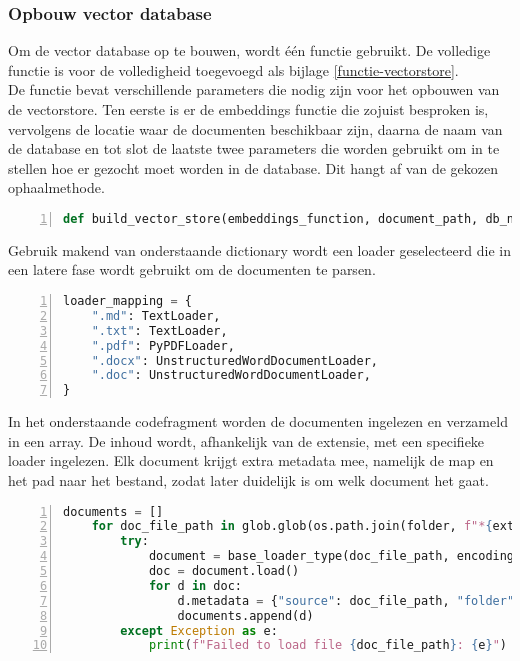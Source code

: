 \subsubsection{Opbouw vector database}
Om de vector database op te bouwen, wordt één functie gebruikt. De volledige functie is voor de volledigheid toegevoegd als bijlage \ref{functie-vectorstore}.
\\[1em]
De functie bevat verschillende parameters die nodig zijn voor het opbouwen van de vectorstore. Ten eerste is er de embeddings functie die zojuist besproken is, vervolgens de locatie waar de documenten beschikbaar zijn, daarna de naam van de database en tot slot de laatste twee parameters die worden gebruikt om in te stellen hoe er gezocht moet worden in de database. Dit hangt af van de gekozen ophaalmethode.

\begin{lstlisting}[basicstyle=\small, frame=single, breaklines=true, postbreak=\mbox{\textcolor{red}{$\hookrightarrow$}\space}, escapeinside ={\%,}, escapechar={!},
    numbers=left, language=Python, caption=Functie met parameters]
def build_vector_store(embeddings_function, document_path, db_name, search_type, search_kwargs):
\end{lstlisting}

Gebruik makend van onderstaande dictionary wordt een loader geselecteerd die in een latere fase wordt gebruikt om de documenten te parsen.

\begin{lstlisting}[basicstyle=\small, frame=single, breaklines=true, postbreak=\mbox{\textcolor{red}{$\hookrightarrow$}\space}, escapeinside ={\%,}, escapechar={!},
    numbers=left, language=Python, caption=Mapping van bestandsextensies naar de bijbehorende document loaders]
loader_mapping = {
    ".md": TextLoader,
    ".txt": TextLoader,
    ".pdf": PyPDFLoader,
    ".docx": UnstructuredWordDocumentLoader,
    ".doc": UnstructuredWordDocumentLoader,
}
\end{lstlisting}

In het onderstaande codefragment worden de documenten ingelezen en verzameld in een array. De inhoud wordt, afhankelijk van de extensie, met een specifieke loader ingelezen. Elk document krijgt extra metadata mee, namelijk de map en het pad naar het bestand, zodat later duidelijk is om welk document het gaat.

\begin{lstlisting}[basicstyle=\small, frame=single, breaklines=true, postbreak=\mbox{\textcolor{red}{$\hookrightarrow$}\space}, escapeinside ={\%,}, escapechar={!},
    numbers=left, language=Python, caption=Inladen en parsen van documenten per bestandstype met toevoeging van metadata]
    documents = []
    for doc_file_path in glob.glob(os.path.join(folder, f"*{ext}")):
        try:
            document = base_loader_type(doc_file_path, encoding="utf-8")
            doc = document.load()
            for d in doc:
                d.metadata = {"source": doc_file_path, "folder": folder}
                documents.append(d)
        except Exception as e:
            print(f"Failed to load file {doc_file_path}: {e}")
\end{lstlisting}

